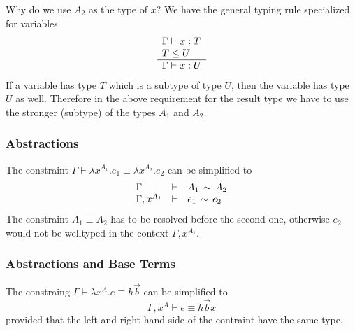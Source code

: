 Why do we use $A_2$ as the type of $x$? We have the general typing rule
specialized for variables
$$
    \begin{array}{l} 
        \Gamma \vdash x : T
        \\
        T \le U
     \\ \hline 
        \Gamma \vdash x: U
     \end{array}
$$
If a variable has type $T$ which is a subtype of type $U$, then the variable has
type $U$ as well. Therefore in the above requirement for the result type we have
to use the stronger (subtype) of the types $A_1$ and $A_2$.




\subsubsection{Abstractions}

The constraint $\Gamma \vdash \lambda x^{A_1}. e_1 \equiv \lambda x^{A_2}. e_2$
can be simplified to
$$
    \begin{array}{lllll} 
        \Gamma          & \vdash & A_1 \,\sim\, A_2
        \\
        \Gamma, x^{A_1} & \vdash & e_1 \,\sim\, e_2
     \end{array}
$$
%
The constraint $A_1 \equiv A_2$ has to be resolved before the second one,
otherwise $e_2$ would not be welltyped in the context $\Gamma, x^{A_1}$.




\subsubsection{Abstractions and Base Terms}

The constraing $\Gamma \vdash \lambda x^A.e \equiv h \vec b$ can be simplified
to
$$
    \Gamma, x^A \vdash e \equiv h \vec b x
$$
provided that the left and right hand side of the contraint have the same type.

